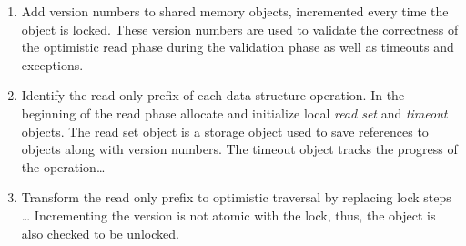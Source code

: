 \begin{enumerate}
  \item Add version numbers to shared memory objects, 
  incremented every time the object is locked. These 
  version numbers are used to validate the correctness
  of the optimistic read phase during the validation phase
  as well as timeouts and exceptions.
  
  \item Identify the read only prefix of each data structure 
  operation. In the beginning of the read phase allocate 
  and initialize local \emph{read set} and \emph{timeout}
  objects. The read set object is a storage object used to save 
  references to objects along with version numbers. 
  The timeout object tracks the progress of the operation\ldots 
    
  \item Transform the read only prefix to optimistic traversal 
   by replacing lock steps \ldots 
   Incrementing the version is not atomic with the lock, thus, 
   the object is also checked to be unlocked. 

\end{enumerate}


